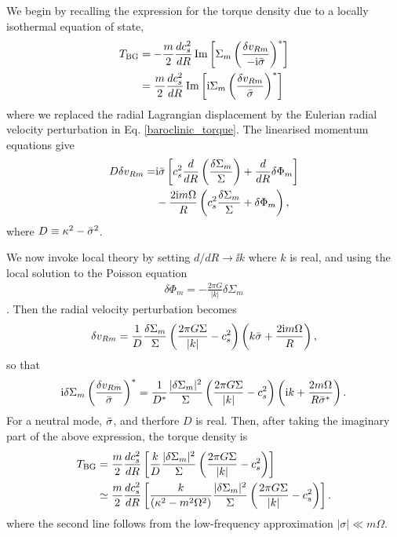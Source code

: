 We begin by recalling the expression for the torque density due to a
locally isothermal equation of state,
\begin{align}
  T_\mathrm{BG} &= -\frac{m}{2}\frac{dc_s^2}{dR}\operatorname{Im}\left[\Sigma_m \left(\frac{\delta
        v_{Rm}}{-\mathrm{i}\bar{\sigma}}\right)^*\right] \notag\\
  & = \frac{m}{2}\frac{dc_s^2}{dR}\operatorname{Im}\left[\mathrm{i} \Sigma_m \left(\frac{\delta
        v_{Rm}}{\bar{\sigma}}\right)^*\right]
\end{align}
where we replaced the radial Lagrangian displacement by the Eulerian
radial velocity perturbation in Eq. \ref{baroclinic_torque}. 
The linearised momentum equations give
\begin{align}
  D\delta v_{Rm} =& 
  \mathrm{i}\bar{\sigma}\left[c_s^2\frac{d}{dR}\left(\frac{\delta\Sigma_m}{\Sigma}\right)
    + \frac{d}{dR}\delta\Phi_m\right] \notag\\ 
  &- \frac{2\mathrm{i}
    m\Omega}{R}\left(c_s^2\frac{\delta\Sigma_m}{\Sigma} +
    \delta\Phi_m\right),
\end{align}
where $D\equiv \kappa^2 - \bar{\sigma}^2$. 

We now invoke local theory by setting $d/dR \to \ii k$ where $k$ is
real, and using the local solution to the Poisson equation
\begin{align}
  \delta\Phi_m = -\frac{2\pi G}{|k|}\delta\Sigma_m 
\end{align}
\citep{shu91}. Then the radial velocity perturbation becomes
\begin{align}
  \delta v_{Rm} =
  \frac{1}{D}\frac{\delta\Sigma_m}{\Sigma}\left(\frac{2\pi G
      \Sigma}{|k|} - c_s^2\right)\left(k\bar{\sigma} + \frac{2\mathrm{i}
      m\Omega}{R}\right),
\end{align}
so that 
\begin{align}
  \mathrm{i}\delta\Sigma_m \left(\frac{\delta v_{Rm}}{\bar{\sigma}}\right)^* =
  \frac{1}{D^*}\frac{|\delta\Sigma_m|^2}{\Sigma}\left(\frac{2\pi G
      \Sigma}{|k|} - c_s^2\right)\left(\mathrm{i} k  + \frac{2
      m\Omega}{R\bar{\sigma}^*}\right). 
\end{align}
For a neutral mode, $\bar{\sigma}$, and therfore $D$ is real. Then, after
taking the imaginary part of the above expression, the torque
density is 
\begin{align}
  T_\mathrm{BG} &=
  \frac{m}{2}\frac{dc_s^2}{dR}\left[\frac{k}{D}\frac{|\delta\Sigma_m|^2}{\Sigma}\left(\frac{2\pi G
      \Sigma}{|k|} - c_s^2\right)\right] \notag\\
&\simeq \frac{m}{2}\frac{dc_s^2}{dR}\left[\frac{k}{\left(\kappa^2 -
        m^2\Omega^2\right)}\frac{|\delta\Sigma_m|^2}{\Sigma}\left(\frac{2\pi
      G \Sigma}{|k|} - c_s^2\right)\right]. 
\end{align}
where the second line follows from the low-frequency approximation
$|\sigma|\ll m\Omega$. 

